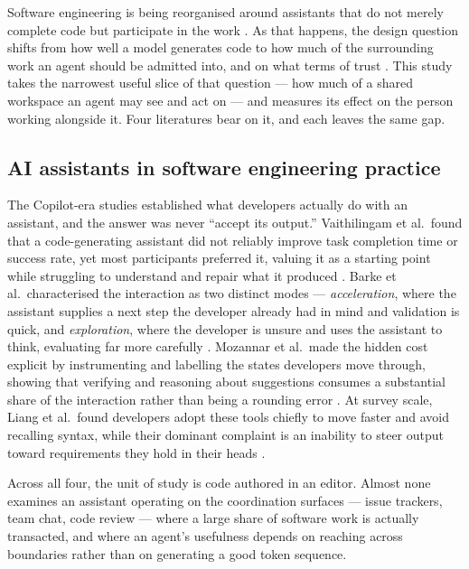 \documentclass[acmsmall,review,screen]{acmart}
\begin{document}
Software engineering is being reorganised around assistants that do not merely
complete code but participate in the work \cite{hoda2026agentic,ahmed2025aise}.
As that happens, the design question shifts from how well a model generates code
to how much of the surrounding work an agent should be admitted into, and on
what terms of trust \cite{roychoudhury2025trust}. This study takes the narrowest
useful slice of that question --- how much of a shared workspace an agent may see
and act on --- and measures its effect on the person working alongside it. Four
literatures bear on it, and each leaves the same gap.

\subsection{AI assistants in software engineering practice}

The Copilot-era studies established what developers actually do with an
assistant, and the answer was never ``accept its output.'' Vaithilingam et
al.\ found that a code-generating assistant did not reliably improve task
completion time or success rate, yet most participants preferred it, valuing it
as a starting point while struggling to understand and repair what it produced
\cite{vaithilingam2022expectation}. Barke et al.\ characterised the interaction
as two distinct modes --- \emph{acceleration}, where the assistant supplies a next
step the developer already had in mind and validation is quick, and
\emph{exploration}, where the developer is unsure and uses the assistant to think,
evaluating far more carefully \cite{barke2023grounded}. Mozannar et al.\ made the
hidden cost explicit by instrumenting and labelling the states developers move
through, showing that verifying and reasoning about suggestions consumes a
substantial share of the interaction rather than being a rounding error
\cite{mozannar2024reading}. At survey scale, Liang et al.\ found developers adopt
these tools chiefly to move faster and avoid recalling syntax, while their
dominant complaint is an inability to steer output toward requirements they hold
in their heads \cite{liang2024largescale}.

Across all four, the unit of study is code authored in an editor. Almost none
examines an assistant operating on the coordination surfaces --- issue trackers,
team chat, code review --- where a large share of software work is actually
transacted, and where an agent's usefulness depends on reaching across
boundaries rather than on generating a good token sequence.
\end{document}
